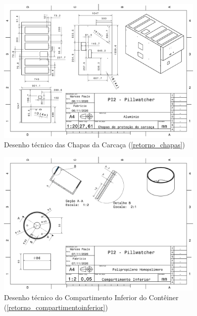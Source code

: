 \begin{apendicesenv}
\begin{figure}[H]
    \centering
    \includegraphics[width=0.9\textwidth]{figuras/estrutura/Desenhos/Chapas_Exterior.pdf}
    \caption{Desenho técnico das Chapas da Carcaça (\ref{retorno_chapas})}
    \label{fig:chapasexterior}
\end{figure}

\begin{figure}[H]
    \centering
    \includegraphics[width=0.9\textwidth]{figuras/estrutura/Desenhos/Compartimento_Inferior.pdf}
    \caption{Desenho técnico do Compartimento Inferior do Contêiner (\ref{retorno_compartimentoinferior})}
    \label{fig:compartimentoinferior}
\end{figure}


\end{apendicesenv}

